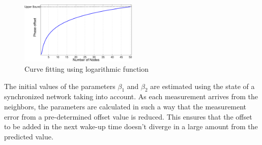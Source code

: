 \documentclass[journal]{IEEEtran}
\begin{document}
\begin{figure}
\centering
\includegraphics[width=0.5\textwidth]{curvefit}
\caption{Curve fitting using logarithmic function} \label{curvefit}
\end{figure}
\par
The initial values of the parameters $\beta_1$ and $\beta_2$ are estimated using the state of a synchronized network taking into account. As each measurement arrives from the neighbors, the parameters are calculated in such a way that the measurement error from a
pre-determined offset value is reduced. This ensures that the offset to be added in the next wake-up time doesn't diverge in a large
amount from the predicted value.
\end{document}

